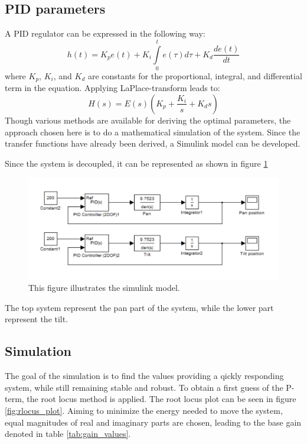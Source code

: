 \subsection{PID parameters}
A PID regulator can be expressed in the following way:
\begin{equation}
	h(t) = K_p e(t) + K_i \int\limits_0^t e(\tau) d\tau + K_d \frac{de(t)}{dt}
\end{equation}
where $K_p$, $K_i$, and $K_d$ are constants for the proportional, integral, and differential term in the equation. Applying LaPlace-transform leads to:
\begin{equation}
	H(s) = E(s)(K_p + \frac{K_i}{s} + K_d s)
\end{equation}
Though various methods are available for deriving the optimal parameters, the
approach chosen here is to do a mathematical simulation of the system. Since the
transfer functions have already been derived, a Simulink model can be developed.

Since the system is decoupled, it can be represented as shown in figure \ref{fig:control_sketch} \begin{figure}[htb]
	\centering
	\includegraphics[width=\textwidth,trim=0 0 0 0]{graphics/Simulink.pdf} %
	\caption{This figure illustrates the simulink model.}
	\label{fig:control_sketch}			%
\end{figure}
The top system represent the pan part of the system, while the lower part represent the tilt.

\subsection{Simulation}
The goal of the simulation is to find the values providing a qickly responding system, while still remaining stable and robust. To obtain a first guess of the P-term, the root locus method is applied. The root locus plot can be seen in figure \ref{fig:rlocus_plot}. Aiming to minimize the energy needed to move the system, equal magnitudes of real and imaginary parts are chosen, leading to the base gain denoted in table \ref{tab:gain_values}.

